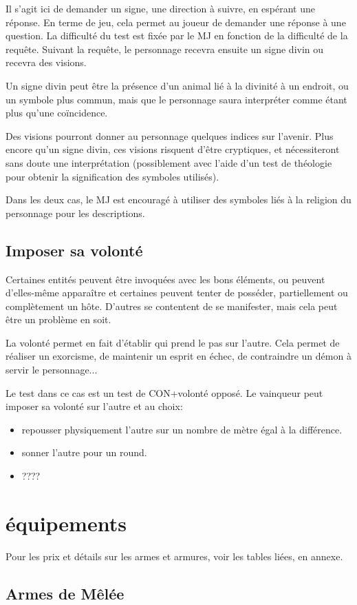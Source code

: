 \documentclass[10pt,a4paper,twocolumn]{book}
\begin{document}
Il s'agit ici de demander un signe, une direction à suivre, en espérant une réponse. En terme de jeu, cela permet au joueur de demander une réponse à une question. La difficulté du test est fixée par le MJ en fonction de la difficulté de la requête. 
Suivant la requête, le personnage recevra ensuite un signe divin ou recevra des visions.

Un signe divin peut être la présence d'un animal lié à la divinité à un endroit, ou un symbole plus commun, mais que le personnage saura interpréter comme étant plus qu'une coïncidence.

Des visions pourront donner au personnage quelques indices sur l'avenir. Plus encore qu'un signe divin, ces visions risquent d'être cryptiques, et nécessiteront sans doute une interprétation (possiblement avec l'aide d'un test de théologie pour obtenir la signification des symboles utilisés).

Dans les deux cas, le MJ est encouragé à utiliser des symboles liés à la religion du personnage pour les descriptions.
\section{Imposer sa volonté}
Certaines entités peuvent être invoquées avec les bons éléments, ou peuvent d'elles-même apparaître et certaines peuvent tenter de posséder, partiellement ou complètement un hôte. D'autres se contentent de se manifester, mais cela peut être un problème en soit. 

La volonté permet en fait d'établir  qui prend le pas sur l'autre. Cela permet de réaliser un exorcisme, de maintenir un esprit en échec, de contraindre un démon à servir le personnage...

Le test dans ce cas est un test de CON+volonté opposé. Le vainqueur peut imposer sa volonté sur l'autre et au choix:
\begin{itemize}
\item repousser physiquement l'autre sur un nombre de mètre égal à la différence.
\item sonner l'autre pour un round.
\item ????
\end{itemize}
\chapter{équipements}
Pour les prix et détails sur les armes et armures, voir les tables liées, en annexe.
\section{Armes de Mêlée}
\end{document}
